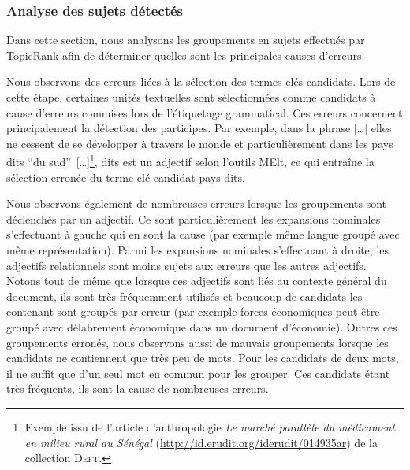         \subsubsection{Analyse des sujets détectés}
        \label{subsubsec:main-automatic_keyphrase_annotation-unsupervised_automatic_keyphrase_extraction-error_analysis-detected_topics}
          Dans cette section, nous analysons les groupements en sujets effectués
          par Topic\-Rank afin de déterminer quelles sont les principales causes
          d'erreurs.


          Nous observons des erreurs liées à la sélection des termes-clés
          candidats. Lors de cette étape, certaines unités textuelles sont
          sélectionnées comme candidats à cause d'erreurs commises lors de
          l'étiquetage grammatical. Ces erreurs concernent principalement la
          détection des participes. Par exemple, dans la phrase \og{}[\dots]
          elles ne cessent de se développer à travers le monde et
          particulièrement dans les pays dits ``du
          sud''~[\dots]\fg{}\footnote{Exemple issu de l'article d'anthropologie
          \textit{Le marché parallèle du médicament en milieu rural au Sénégal}
          (\url{http://id.erudit.org/iderudit/014935ar}) de la collection
          \textsc{Deft}.}, \og{}dits\fg{} est un adjectif selon l'outils MElt, ce qui
          entraîne la sélection erronée du terme-clé candidat \og{}pays
          dits\fg{}.

          Nous observons également de nombreuses erreurs lorsque les groupements
          sont déclenchés par un adjectif. Ce sont particulièrement les
          expansions nominales s'effectuant à gauche qui en sont la cause (par
          exemple \og{}même langue\fg{} groupé avec \og{}même
          représentation\fg{}). Parmi les expansions nominales s'effectuant à
          droite, les adjectifs relationnels sont moins sujets aux erreurs que
          les autres adjectifs. Notons tout de même que lorsque ces adjectifs
          sont liés au contexte général du document, ils sont très fréquemment
          utilisés et beaucoup de candidats les contenant sont groupés par
          erreur (par exemple \og{}forces économiques\fg{} peut être groupé
          avec \og{}délabrement économique\fg{} dans un document d'économie).
          Outres ces groupements erronés, nous observons aussi de mauvais
          groupements lorsque les candidats ne contiennent que très peu de mots.
          Pour les candidats de deux mots, il ne suffit que d'un seul mot en
          commun pour les grouper. Ces candidats étant très fréquents, ils sont
          la cause de nombreuses erreurs.

